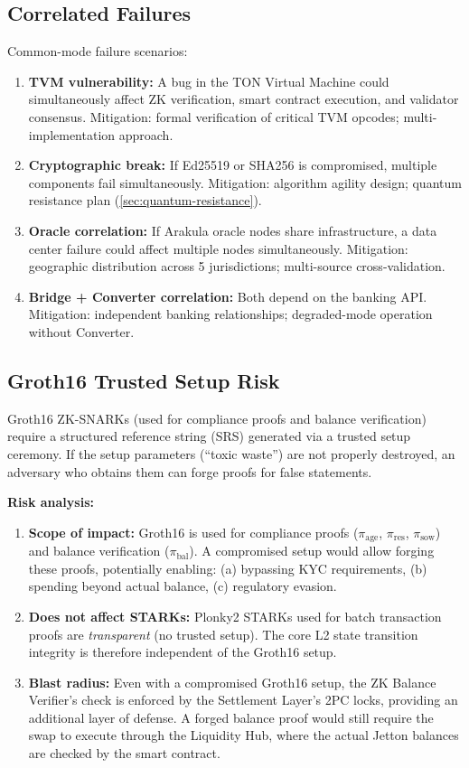 \documentclass[12pt,a4paper]{article}
\theoremstyle{definition}
\theoremstyle{remark}
\begin{document}
\subsection{Correlated Failures}

Common-mode failure scenarios:
\begin{enumerate}[nosep]
    \item \textbf{TVM vulnerability:} A bug in the TON Virtual Machine could simultaneously affect ZK verification, smart contract execution, and validator consensus. Mitigation: formal verification of critical TVM opcodes; multi-implementation approach.
    \item \textbf{Cryptographic break:} If Ed25519 or SHA256 is compromised, multiple components fail simultaneously. Mitigation: algorithm agility design; quantum resistance plan (\cref{sec:quantum-resistance}).
    \item \textbf{Oracle correlation:} If Arakula oracle nodes share infrastructure, a data center failure could affect multiple nodes simultaneously. Mitigation: geographic distribution across 5 jurisdictions; multi-source cross-validation.
    \item \textbf{Bridge + Converter correlation:} Both depend on the banking API. Mitigation: independent banking relationships; degraded-mode operation without Converter.
\end{enumerate}

\subsection{Groth16 Trusted Setup Risk}
\label{sec:groth16-risk}

Groth16 ZK-SNARKs (used for compliance proofs and balance verification) require a structured reference string (SRS) generated via a trusted setup ceremony. If the setup parameters (``toxic waste'') are not properly destroyed, an adversary who obtains them can forge proofs for false statements.

\textbf{Risk analysis:}
\begin{enumerate}[nosep]
    \item \textbf{Scope of impact:} Groth16 is used for compliance proofs ($\pi_{\text{age}}$, $\pi_{\text{res}}$, $\pi_{\text{sow}}$) and balance verification ($\pi_{\text{bal}}$). A compromised setup would allow forging these proofs, potentially enabling: (a) bypassing KYC requirements, (b) spending beyond actual balance, (c) regulatory evasion.
    \item \textbf{Does not affect STARKs:} Plonky2 STARKs used for batch transaction proofs are \emph{transparent} (no trusted setup). The core L2 state transition integrity is therefore independent of the Groth16 setup.
    \item \textbf{Blast radius:} Even with a compromised Groth16 setup, the ZK Balance Verifier's check is enforced by the Settlement Layer's 2PC locks, providing an additional layer of defense. A forged balance proof would still require the swap to execute through the Liquidity Hub, where the actual Jetton balances are checked by the smart contract.
\end{enumerate}
\end{document}
